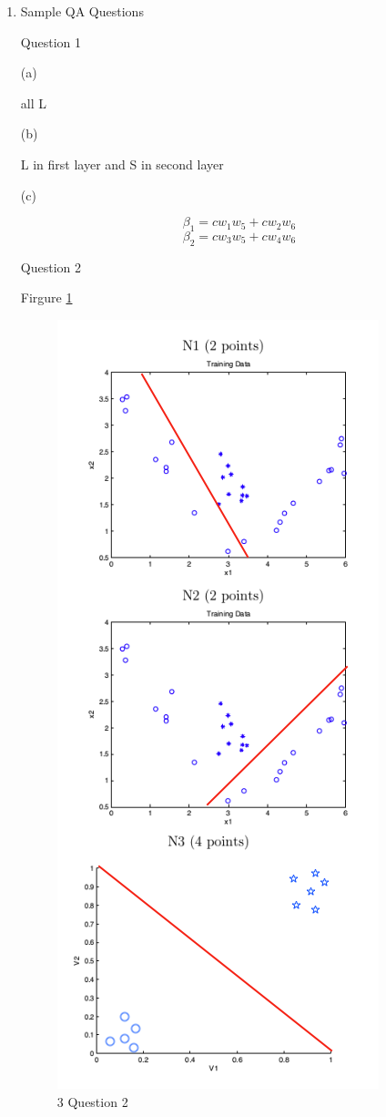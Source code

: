 \documentclass[11pt]{article}
\begin{document}
\begin{enumerate}
\item
Sample QA Questions

Question 1
\medskip

(a)

all L


(b)

L in first layer and S in second layer

(c)

$$
\beta_1 = cw_1w_5 + cw_2w_6
$$
$$
\beta_2 = cw_3w_5 + cw_4w_6
$$

Question 2
\medskip

Firgure \ref{fig:nn}

\begin{figure}[!h]
  \centering
  \includegraphics[width=0.4\linewidth]{figures/nn.png}
  \caption{3 Question 2}
  \label{fig:nn}
\end{figure}


\end{enumerate}
\end{document}
